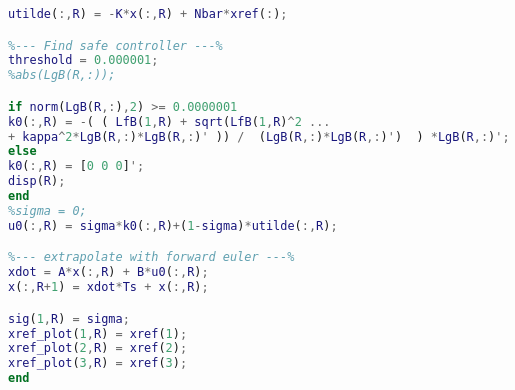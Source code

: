 \begin{lstlisting}[language=matlab]
utilde(:,R) = -K*x(:,R) + Nbar*xref(:);

%--- Find safe controller ---%
threshold = 0.000001;
%abs(LgB(R,:));

if norm(LgB(R,:),2) >= 0.0000001
k0(:,R) = -( ( LfB(1,R) + sqrt(LfB(1,R)^2 ...
+ kappa^2*LgB(R,:)*LgB(R,:)' )) /  (LgB(R,:)*LgB(R,:)')  ) *LgB(R,:)';
else
k0(:,R) = [0 0 0]';
disp(R);
end 
%sigma = 0;
u0(:,R) = sigma*k0(:,R)+(1-sigma)*utilde(:,R);

%--- extrapolate with forward euler ---%
xdot = A*x(:,R) + B*u0(:,R);
x(:,R+1) = xdot*Ts + x(:,R);

sig(1,R) = sigma;
xref_plot(1,R) = xref(1);
xref_plot(2,R) = xref(2);
xref_plot(3,R) = xref(3);
end
\end{lstlisting}